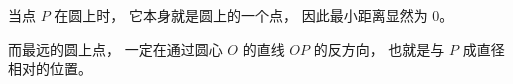 \begin{explanationbox}
当点 $P$ 在圆上时，
它本身就是圆上的一个点，
因此最小距离显然为 $0$。

而最远的圆上点，
一定在通过圆心 $O$ 的直线 $OP$ 的反方向，
也就是与 $P$ 成直径相对的位置。
\end{explanationbox}
